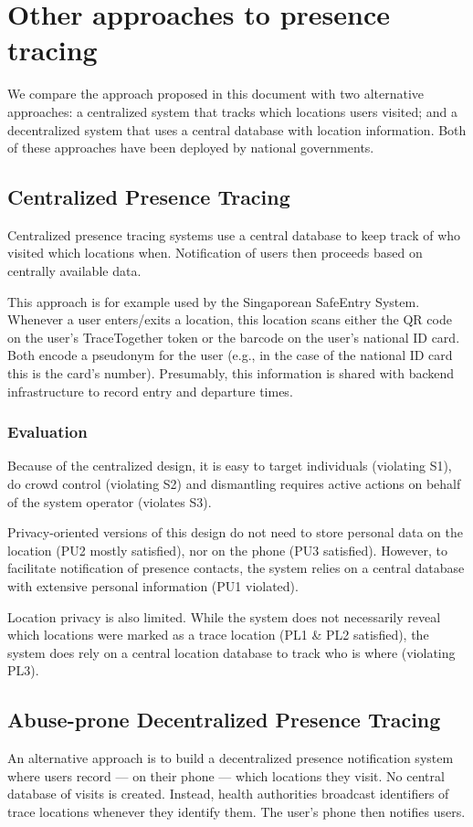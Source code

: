 \section{Other approaches to presence tracing}

We compare the approach proposed in this document with two alternative approaches: a centralized system that tracks which locations users visited; and a decentralized system that uses a central database with location information. Both of these approaches have been deployed by national governments.

\subsection{Centralized Presence Tracing}
Centralized presence tracing systems use a central database to keep track of who visited which locations when. Notification of users then proceeds based on centrally available data.

This approach is for example used by the Singaporean SafeEntry System. Whenever a user enters/exits a location, this location scans either the QR code on the user’s TraceTogether token or the barcode on the user’s national ID card. Both encode a pseudonym for the user (e.g., in the case of the national ID card this is the card’s number). Presumably, this information is shared with backend infrastructure to record entry and departure times.

\subsubsection{Evaluation}
Because of the centralized design, it is easy to target individuals (violating S1), do crowd control (violating S2) and dismantling requires active actions on behalf of the system operator (violates S3).

Privacy-oriented versions of this design do not need to store personal data on the location (PU2 mostly satisfied), nor on the phone (PU3 satisfied). However, to facilitate notification of presence contacts, the system relies on a central database with extensive personal information (PU1 violated). 

Location privacy is also limited. While the system does not necessarily reveal which locations were marked as a trace location (PL1 \& PL2 satisfied), the system does rely on a central location database to track who is where (violating PL3).

\subsection{Abuse-prone Decentralized Presence Tracing}
An alternative approach is to build a decentralized presence notification system where users record — on their phone — which locations they visit. No central database of visits is created. Instead, health authorities broadcast identifiers of trace locations whenever they identify them. The user’s phone then notifies users.

